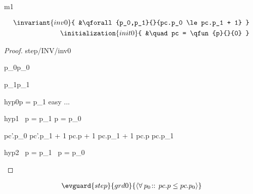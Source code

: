 \documentclass[12pt]{amsart}
\begin{document}
\begin{machine}{m1}


\begin{align*}
\invariant{inv0}
{	&\qforall{p_0,p_1}{}{pc.p_0 \le pc.p_1 + 1} } \\
\initialization{init0}
{	&\quad pc = \qfun{p}{}{0} }
\end{align*}

\begin{proof}{step/INV/inv0}
	\begin{free:var}{p_0}{p_0}
	\begin{free:var}{p_1}{p_1}
	\begin{by:cases}
		\begin{case}{hyp0}{p = p_1}
		easy ...
		\easy
		
		\end{case}
		\begin{case}{hyp1}{\neg ~ p = p_1 \land p = p_0}
\begin{calculation}
		pc'.p_0 \le pc'.p_1 + 1
		pc.p + 1 \le pc.p_1 + 1
		pc.p \le pc.p_1
	\hint{=}{ \ref{grd0} }
		\true
\end{calculation}
		\end{case}
		\begin{case}{hyp2}{\neg ~ p = p_1 \1\land \neg~p = p_0}
		\easy
		\end{case}
	\end{by:cases}
	\end{free:var}
	\end{free:var}
\end{proof}

\begin{align*}
\evguard{step}{grd0}
{	\qforall{p_0}{}{ pc.p \le pc.p_0 } }
\end{align*}

\end{machine}
\end{document}
